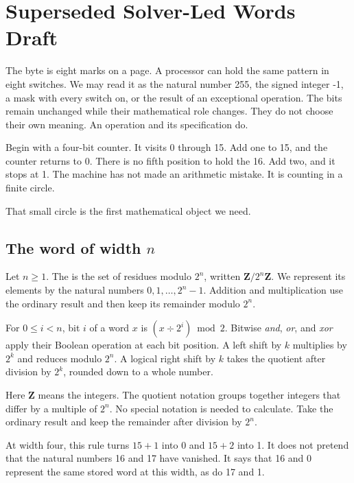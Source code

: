 \chapter{Superseded Solver-Led Words Draft}
\label{ch:words}

The byte  is eight marks on a page. A processor can hold the
same pattern in eight switches. We may read it as the natural number 255, the
signed integer -1, a mask with every switch on, or the result of an
exceptional operation. The bits remain unchanged while their mathematical
role changes. They do not choose their own meaning. An operation and its
specification do.

Begin with a four-bit counter. It visits 0 through 15. Add one to 15, and the
counter returns to 0. There is no fifth position to hold the 16. Add two, and
it stops at 1. The machine has not made an arithmetic mistake. It is counting
in a finite circle.

That small circle is the first mathematical object we need.

\section{The word of width \(n\)}
\label{sec:word}

\begin{definition}[title={Word \(n\)}]
Let \(n \geq 1\). The  is the set of residues
modulo \(2^n\), written \(\mathbf{Z}/2^n\mathbf{Z}\). We represent its
elements by the natural numbers \(0,1,\ldots,2^n-1\). Addition and
multiplication use the ordinary result and then keep its remainder modulo
\(2^n\).

For \(0 \leq i < n\), bit \(i\) of a word \(x\) is
\((x \div 2^i) \bmod 2\). Bitwise \emph{and}, \emph{or}, and \emph{xor}
apply their Boolean operation at each bit position. A left shift by \(k\)
multiplies by \(2^k\) and reduces modulo \(2^n\). A logical right shift by
\(k\) takes the quotient after division by \(2^k\), rounded down to a whole
number.
\end{definition}

Here \(\mathbf{Z}\) means the integers. The quotient notation groups together
integers that differ by a multiple of \(2^n\). No special notation is needed
to calculate. Take the ordinary result and keep the remainder after division
by \(2^n\).

At width four, this rule turns \(15+1\) into 0 and \(15+2\) into 1. It does
not pretend that the natural numbers 16 and 17 have vanished. It says that 16
and 0 represent the same stored word at this width, as do 17 and 1.

